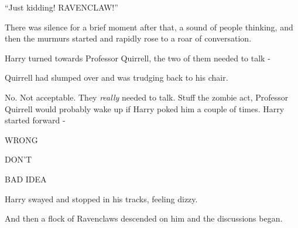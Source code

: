 ``Just kidding! RAVENCLAW!''

There was silence for a brief moment after that, a sound of people thinking, and then the murmurs started and rapidly rose to a roar of conversation.

Harry turned towards Professor Quirrell, the two of them needed to talk -

Quirrell had slumped over and was trudging back to his chair.

No. Not acceptable. They \emph{really} needed to talk. Stuff the zombie act, Professor Quirrell would probably wake up if Harry poked him a couple of times. Harry started forward -

WRONG

DON'T

BAD IDEA

Harry swayed and stopped in his tracks, feeling dizzy.

And then a flock of Ravenclaws descended on him and the discussions began.
